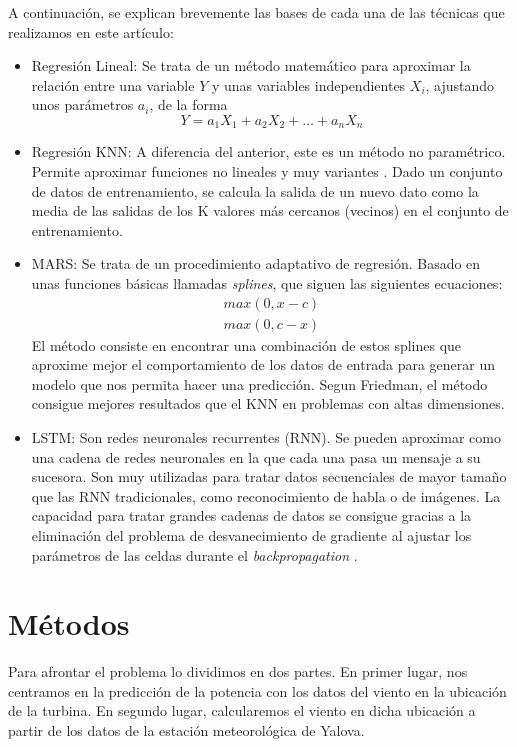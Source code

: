 \documentclass[journal]{IEEEtran}
\begin{document}
A continuación, se explican brevemente las bases de cada una de las técnicas que realizamos en este artículo:
\begin{itemize}
    \item Regresión Lineal: Se trata de un método matemático para aproximar la relación entre una variable $Y$ y unas variables independientes $X_i$, ajustando unos parámetros $a_i$, de la forma
\begin{equation}
\label{eqn:Reg}
 Y = a_1X_1 + a_2X_2+\ldots + a_nX_n
\end{equation}

    \item Regresión KNN: A diferencia del anterior, este es un método no paramétrico. Permite aproximar funciones no lineales y muy variantes \cite{James2013}. Dado un conjunto de datos de entrenamiento, se calcula la salida de un nuevo dato como la media de las salidas de los K valores más cercanos (vecinos) en el conjunto de entrenamiento.
    \item MARS: Se trata de un procedimiento adaptativo de regresión. Basado en unas funciones básicas llamadas \emph{splines}, que siguen las siguientes ecuaciones: 
    \begin{align*} 
        max(0,x-c) \\
        max(0,c-x)
    \end{align*}
    El método consiste en encontrar una combinación de estos splines que aproxime mejor el comportamiento de los datos de entrada para generar un modelo que nos permita hacer una predicción. Segun Friedman, \cite{JHFRIEDMAN1991} el método consigue mejores resultados que el KNN en problemas con altas dimensiones.
    \item LSTM: Son redes neuronales recurrentes (RNN). Se pueden aproximar como una cadena de redes neuronales en la que cada una pasa un mensaje a su sucesora. Son muy utilizadas para tratar datos secuenciales de mayor tamaño que las RNN tradicionales, como reconocimiento de habla o de imágenes. La capacidad para tratar grandes cadenas de datos se consigue gracias a la eliminación del problema de desvanecimiento de gradiente al ajustar los parámetros de las celdas durante el \emph{backpropagation} \cite{45500}.

\end{itemize}


 


\section{Métodos}
Para afrontar el problema lo dividimos en dos partes. En primer lugar, nos centramos en la predicción de la potencia con los datos del viento en la ubicación de la turbina. En segundo lugar, calcularemos el viento en dicha ubicación a partir de los datos de la estación meteorológica de Yalova. 
\end{document}
